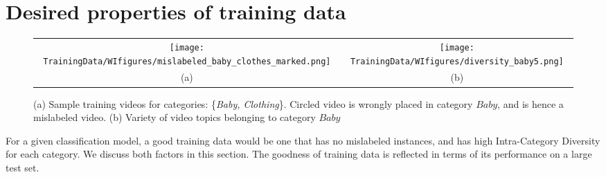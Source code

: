 \section{Desired properties of training data}
\label{sec:desiredpropdata}
\begin{figure*}[!htb]
\centering
\begin{tabular}{cc}
\texttt{[image: TrainingData/WIfigures/mislabeled\_baby\_clothes\_marked.png]}
&
\texttt{[image: TrainingData/WIfigures/diversity\_baby5.png]} \\ 
(a) & (b) \\ 
\end{tabular}
\caption{ \small{(a) Sample training videos for categories: \{\textit{Baby, Clothing}\}. Circled video is wrongly placed in category $Baby$, and is hence a mislabeled video. (b) Variety of video topics belonging to category $Baby$  }}
\label{fig:trainingdatapropsfigs}
\end{figure*} 
For a given classification model, a good training data would be one that has no mislabeled instances, and has high Intra-Category Diversity for each category. We discuss both factors in this section. The goodness of training data is reflected in terms of its performance on a large test set. 

